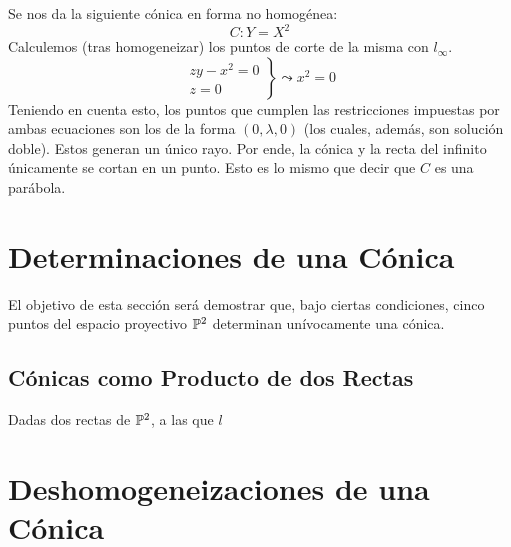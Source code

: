 \begin{exa}[Parábola]
	Se nos da la siguiente cónica en forma no homogénea:
	\[C:Y=X^2\]
	Calculemos (tras homogeneizar) los puntos de corte de la misma con $l_\infty$.
	\[\left.\begin{array}{c}
	zy-x^2=0\\
	z=0
	\end{array}\right\}\leadsto x^2=0\]
	Teniendo en cuenta esto, los puntos que cumplen las restricciones impuestas por ambas ecuaciones son los de la forma $(0,\lambda,0)$ (los cuales, además, son solución doble). Estos generan un único rayo. Por ende, la cónica y la recta del infinito únicamente se cortan en un punto. Esto es lo mismo que decir que $C$ es una parábola.
\end{exa}
\section{Determinaciones de una Cónica}
El objetivo de esta sección será demostrar que, bajo ciertas condiciones, cinco puntos del espacio proyectivo $\mathbb{P}^2$ determinan unívocamente una cónica.
\subsection{Cónicas como Producto de dos Rectas}
Dadas dos rectas de $\mathbb{P}^2$, a las que $l$
\section{Deshomogeneizaciones de una Cónica}